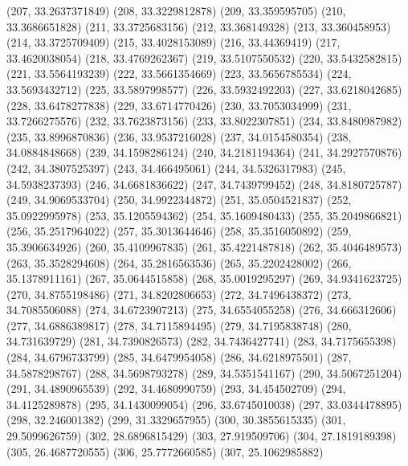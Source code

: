 {					(207, 33.2637371849)
					(208, 33.3229812878)
					(209, 33.359595705)
					(210, 33.3686651828)
					(211, 33.3725683156)
					(212, 33.368149328)
					(213, 33.360458953)
					(214, 33.3725709409)
					(215, 33.4028153089)
					(216, 33.44369419)
					(217, 33.4620038054)
					(218, 33.4769262367)
					(219, 33.5107550532)
					(220, 33.5432582815)
					(221, 33.5564193239)
					(222, 33.5661354669)
					(223, 33.5656785534)
					(224, 33.5693432712)
					(225, 33.5897998577)
					(226, 33.5932492203)
					(227, 33.6218042685)
					(228, 33.6478277838)
					(229, 33.6714770426)
					(230, 33.7053034999)
					(231, 33.7266275576)
					(232, 33.7623873156)
					(233, 33.8022307851)
					(234, 33.8480987982)
					(235, 33.8996870836)
					(236, 33.9537216028)
					(237, 34.0154580354)
					(238, 34.0884848668)
					(239, 34.1598286124)
					(240, 34.2181194364)
					(241, 34.2927570876)
					(242, 34.3807525397)
					(243, 34.466495061)
					(244, 34.5326317983)
					(245, 34.5938237393)
					(246, 34.6681836622)
					(247, 34.7439799452)
					(248, 34.8180725787)
					(249, 34.9069533704)
					(250, 34.9922344872)
					(251, 35.0504521837)
					(252, 35.0922995978)
					(253, 35.1205594362)
					(254, 35.1609480433)
					(255, 35.2049866821)
					(256, 35.2517964022)
					(257, 35.3013644646)
					(258, 35.3516050892)
					(259, 35.3906634926)
					(260, 35.4109967835)
					(261, 35.4221487818)
					(262, 35.4046489573)
					(263, 35.3528294608)
					(264, 35.2816563536)
					(265, 35.2202428002)
					(266, 35.1378911161)
					(267, 35.0644515858)
					(268, 35.0019295297)
					(269, 34.9341623725)
					(270, 34.8755198486)
					(271, 34.8202806653)
					(272, 34.7496438372)
					(273, 34.7085506088)
					(274, 34.6723907213)
					(275, 34.6554055258)
					(276, 34.666312606)
					(277, 34.6886389817)
					(278, 34.7115894495)
					(279, 34.7195838748)
					(280, 34.731639729)
					(281, 34.7390826573)
					(282, 34.7436427741)
					(283, 34.7175655398)
					(284, 34.6796733799)
					(285, 34.6479954058)
					(286, 34.6218975501)
					(287, 34.5878298767)
					(288, 34.5698793278)
					(289, 34.5351541167)
					(290, 34.5067251204)
					(291, 34.4890965539)
					(292, 34.4680990759)
					(293, 34.454502709)
					(294, 34.4125289878)
					(295, 34.1430099054)
					(296, 33.6745010038)
					(297, 33.0344478895)
					(298, 32.246001382)
					(299, 31.3329657955)
					(300, 30.3855615335)
					(301, 29.5099626759)
					(302, 28.6896815429)
					(303, 27.919509706)
					(304, 27.1819189398)
					(305, 26.4687720555)
					(306, 25.7772660585)
					(307, 25.1062985882)
}
